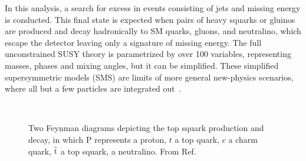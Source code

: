 In this analysis, a search for excess in events consisting of jets and 
missing energy is conducted. This final state is expected when pairs of
heavy squarks or gluinos are produced and decay hadronically to SM quarks,
gluons, and neutralino, which escape the detector leaving only a signature
of missing energy.
The full unconstrained SUSY theory is parametrized by over 100 variables, representing 
masses, phases and mixing angles, but it can be simplified. These simplified supersymmetric 
models (SMS) are limits of more general new-physics scenarios, where all but a few 
particles are integrated out~\cite{Alves:2011wf}.\\
\begin{figure}[ht!]
  \begin{center}
     \\
      \caption{Two Feynman diagrams depicting the top squark production
      and decay, in which P represents a proton, $t$ a top quark, $c$ a charm
      quark, $\tilde{\rm t}$ a top squark, \chiOnez a neutralino. From Ref.~\cite{susy-mc}}
    \label{fig:feynman_sms}
  \end{center}
\end{figure}

